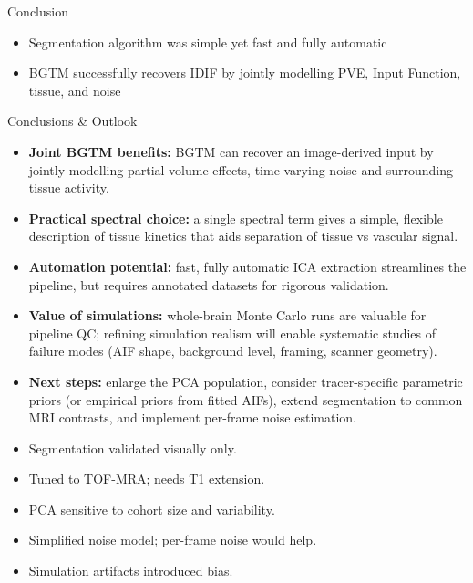 \documentclass[aspectratio=169]{beamer}
\begin{document}
\begin{frame}{Conclusion}
    \begin{itemize}
		\setlength\itemsep{2em}
        \item Segmentation algorithm was simple yet fast and fully automatic
        \item BGTM successfully recovers IDIF by jointly modelling PVE, Input Function, tissue, and noise

    \end{itemize}
\end{frame}

\begin{frame}{Conclusions \& Outlook}
	\begin{itemize}
		\item \textbf{Joint BGTM benefits:} BGTM can recover an image-derived input by jointly modelling partial-volume effects, time-varying noise and surrounding tissue activity.
		\item \textbf{Practical spectral choice:} a single spectral term gives a simple, flexible description of tissue kinetics that aids separation of tissue vs vascular signal.
		\item \textbf{Automation potential:} fast, fully automatic ICA extraction streamlines the pipeline, but requires annotated datasets for rigorous validation.
		\item \textbf{Value of simulations:} whole-brain Monte Carlo runs are valuable for pipeline QC; refining simulation realism will enable systematic studies of failure modes (AIF shape, background level, framing, scanner geometry).
		\item \textbf{Next steps:} enlarge the PCA population, consider tracer-specific parametric priors (or empirical priors from fitted AIFs), extend segmentation to common MRI contrasts, and implement per-frame noise estimation.
	\end{itemize}
\end{frame}
\begin{frame}[t]
	\small
	\begin{itemize}
		\item Segmentation validated visually only.
		\item Tuned to TOF-MRA; needs T1 extension.
		\item PCA sensitive to cohort size and variability.
		\item Simplified noise model; per-frame noise would help.
		\item Simulation artifacts introduced bias.
	\end{itemize}
\end{frame}
\end{document}
